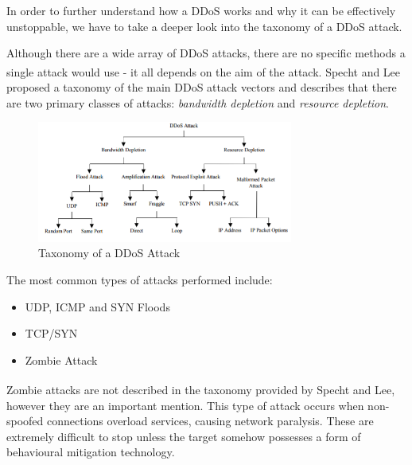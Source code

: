 \raggedright

In order to further understand how a DDoS works and why it can be effectively unstoppable, we have to take a deeper look into the taxonomy of a DDoS attack.

\vspace{0.5cm}

Although there are a wide array of DDoS attacks, there are no specific methods a single attack would use - it all depends on the aim of the attack. Specht and Lee\textsuperscript{\cite{specht2003taxonomies}} proposed a taxonomy of the main DDoS attack vectors and describes that there are two primary classes of attacks: \textit{bandwidth depletion} and \textit{resource depletion}.

\vspace{0.5cm}

\begin{figure}[h]
\begin{center}
	\includegraphics[width=0.75\textwidth]{img/ddos_attack_vectors.png}
	\caption{Taxonomy of a DDoS Attack}
\end{center}
\end{figure}

\vspace{0.5cm}

The most common types of attacks performed include:
\begin{itemize}
	\item{UDP, ICMP and SYN Floods}
	\item{TCP/SYN}
	\item{Zombie Attack}
\end{itemize}

\vspace{0.5cm}

Zombie attacks are not described in the taxonomy provided by Specht and Lee\textsuperscript{\cite{specht2003taxonomies}}, however they are an important mention. This type of attack occurs when non-spoofed connections overload services, causing network paralysis. These are extremely difficult to stop unless the target somehow possesses a form of behavioural mitigation technology.